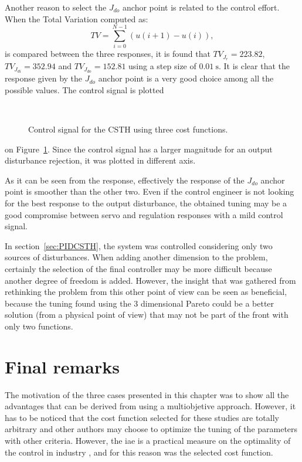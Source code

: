 Another reason to select the $J_{do}$ anchor point is related to the control effort. When the Total Variation computed as:
\begin{equation*}
TV = \sum_{i=0}^{N-1}\left(  u(i+1)-u(i)\right),
\end{equation*}
is compared between the three responses, it is found that $TV_{J_r} = 223.82$, $TV_{J_{di}} = 352.94$ and $TV_{J_{do}} = 152.81$ using a step size of $\SI{0.01}{\second}$. It is clear that the response given by the $J_{do}$ anchor point is a very good choice among all the possible values. The control signal is plotted %
%
\begin{figure}[tb]
	\centering
	\\
	\caption{Control signal for the CSTH using three cost functions.}
	\label{fig:Ch7CSTHControlledCV3Fun}
\end{figure}
%
on Figure~\ref{fig:Ch7CSTHControlledCV3Fun}. Since the control signal has a larger magnitude for an output disturbance rejection, it was plotted in different axis.

As it can be seen from the response, effectively the response of the $J_{do}$ anchor point is smoother than the other two. Even if the control engineer is not looking for the best response to the output disturbance, the obtained tuning may be a good compromise between servo and regulation responses with a mild control signal.

In section~\ref{sec:PIDCSTH}, the system was controlled considering only two sources of disturbances. When adding another dimension to the problem, certainly the selection of the final controller may be more difficult because another degree of freedom is added. However, the insight that was gathered from rethinking the problem from this other point of view can be seen as beneficial, because the tuning found using the 3 dimensional Pareto could be a better solution (from a physical point of view) that may not be part of the front with only two functions.
%
\section{Final remarks}
\label{sec:FinalRemarks}
The motivation of the three cases presented in this chapter was to show all the advantages that can be derived from using a multiobjetive approach. However, it has to be noticed that the cost function selected for these studies are totally  arbitrary and other authors may choose to optimize the tuning of the parameters with other criteria. However, the \gls{iae} is a practical measure on the optimality of the control in industry \citep{Shinskey2002}, and for this reason was the selected cost function.

